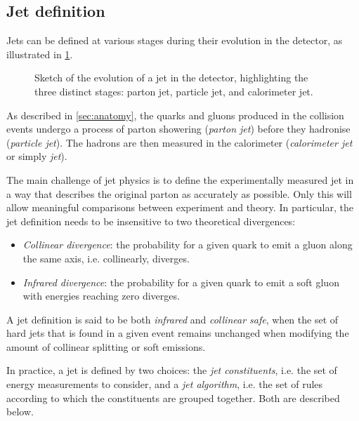\subsection{Jet definition}

Jets can be defined at various stages during their evolution in the detector, as illustrated in \cref{fig:jet-evolution}.
\begin{figure}
    \caption{Sketch of the evolution of a jet in the detector, highlighting the three distinct stages: parton jet, particle jet, and calorimeter jet.}
    \label{fig:jet-evolution}
\end{figure}
As described in \cref{sec:anatomy}, the quarks and gluons produced in the collision events undergo a process of parton showering (\emph{parton jet}) before they hadronise (\emph{particle jet}). The hadrons are then measured in the calorimeter (\emph{calorimeter jet} or simply \emph{jet}).

The main challenge of jet physics is to define the experimentally measured jet in a way that describes the original parton as accurately as possible. 
Only this will allow meaningful comparisons between experiment and theory.
In particular, the jet definition needs to be insensitive to two theoretical divergences:
\begin{itemize}
    \item \emph{Collinear divergence}: the probability for a given quark to emit a gluon along the same axis, i.e. collinearly, diverges.
    \item \emph{Infrared divergence}: the probability for a given quark to emit a soft gluon with energies reaching zero diverges.
\end{itemize}
A jet definition is said to be both \emph{infrared} and \emph{collinear safe}, when the set of hard jets that is found in a given event remains unchanged when modifying the amount of collinear splitting or soft emissions.

In practice, a jet is defined by two choices: the \emph{jet constituents}, i.e. the set of energy measurements to consider, and a \emph{jet algorithm}, i.e. the set of rules according to which the constituents are grouped together.
Both are described below.

